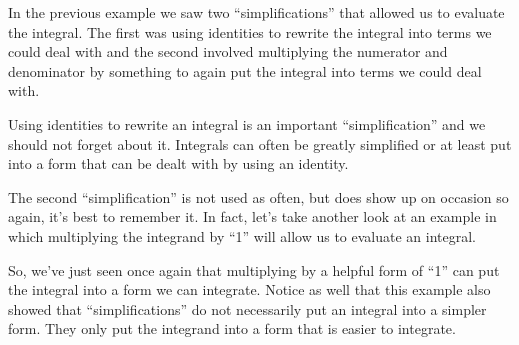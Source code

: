 In the previous example we saw two ``simplifications'' that allowed us to evaluate the integral. The first was using identities to rewrite the integral into terms we could deal with and the second involved multiplying the numerator and denominator by something to again put the integral into terms we could deal with.

Using identities to rewrite an integral is an important ``simplification'' and we should not forget about it. Integrals can often be greatly simplified or at least put into a form that can be dealt with by using an identity.

The second ``simplification'' is not used as often, but does show up on occasion so again, it's best to remember it. In fact, let's take another look at an example in which multiplying the integrand by ``1'' will allow us to evaluate an integral.


So, we've just seen once again that multiplying by a helpful form of ``1'' can put the integral into a form we can integrate. Notice as well that this example also showed that ``simplifications'' do not necessarily put an integral into a simpler form. They only put the integrand into a form that is easier to integrate.

